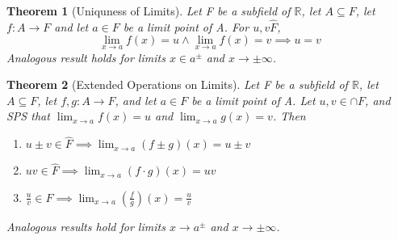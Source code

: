 \documentclass[11pt, oneside]{book}
\theoremstyle{break}
\newtheorem{thm}{Theorem}[section]
\newcommand{\bb}[1]{\mathbb{#1}}		%
\begin{document}
\begin{thm}[Uniquness of Limits]
	Let F be a subfield of $\bb{R}$, let $A \subseteq F$, let $f: A \to F$ and let $a \in F$ be a limit point of A. For $u, v \hat{F}$,
		\[
			\lim_{x \to a} f(x) = u \land \lim_{x \to a} f(x) = v \implies u = v
		\]
	Analogous result holds for limits $x \in a^\pm$ and $x \to \pm \infty$.
\end{thm}

\begin{thm}[Extended Operations on Limits]
	Let F be a subfield of $\bb{R}$, let $A \subseteq F$, let $f, g: A \to F$, and let $a \in F$ be a limit point of A. Let $u ,v \in \cap{F}$, and SPS that $\lim_{x \to a} f(x) = u$ and $\lim_{x \to a} g(x) = v$. Then
	\begin{enumerate}
		\item $u \pm v \in \hat{F} \implies \lim_{x \to a} (f \pm g)(x) = u \pm v$
		\item $uv \in \hat{F} \implies \lim_{x \to a} (f \cdot g)(x) = uv$
		\item $\frac{u}{v} \in \hat{F} \implies \lim_{x \to a} (\frac{f}{g})(x) = \frac{u}{v}$
	\end{enumerate}
	Analogous results hold for limits $x \to a^\pm$ and $x \to \pm \infty$.
\end{thm}
\end{document}

